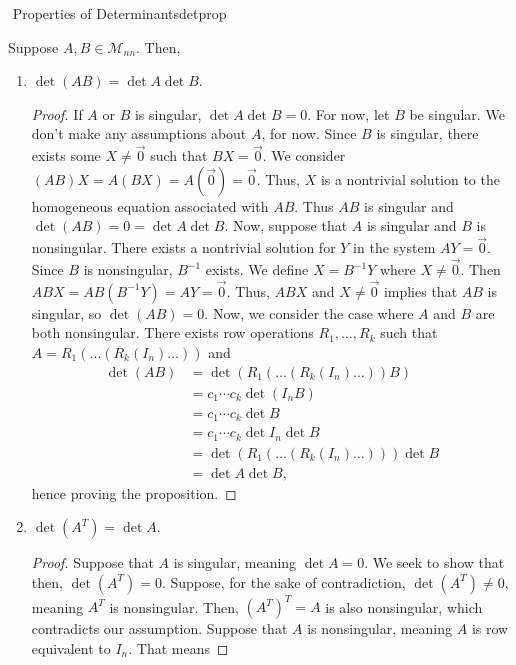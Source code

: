         \begin{theorem}{\Stop\,\,Properties of Determinants}{detprop}

            Suppose \(A,B\in\mathcal{M}_{nn}\). Then,
            \begin{enumerate}
                \item \(\det (AB) = \det A\det B\).
                \begin{proof}
                    If \(A\) or \(B\) is singular, \(\det A\det B=0\). For now, let \(B\) be singular. We don't make any assumptions about \(A\), for now. Since \(B\) is singular, there exists some \(X\neq\vec{0}\) such that \(BX=\vec{0}\). We consider \((AB)X=A(BX)=A(\vec{0})=\vec{0}\). Thus, \(X\) is a nontrivial solution to the homogeneous equation associated with \(AB\). Thus \(AB\) is singular and \(\det (AB) = 0 = \det A\det B\). Now, suppose that \(A\) is singular and \(B\) is nonsingular. There exists a nontrivial solution for \(Y\) in the system \(AY=\vec{0}\). Since \(B\) is nonsingular, \(B^{-1}\) exists. We define \(X=B^{-1}Y\) where \(X\neq\vec{0}\). Then \(ABX=AB(B^{-1}Y)=AY=\vec{0}\). Thus, \(ABX\) and \(X\neq \vec{0}\) implies that \(AB\) is singular, so \(\det (AB)=0\). Now, we consider the case where \(A\) and \(B\) are both nonsingular. There exists row operations \(R_1,\ldots,R_k\) such that \(A=R_1(\ldots(R_k(I_n)\ldots))\) and 
                    \begin{align*}
                        \det (AB)&=\det(R_1(\ldots(R_k(I_n)\ldots))B) \\
                        &=c_1\cdots c_k\det (I_nB) \\
                        &=c_1\cdots c_k\det B \\
                        &=c_1\cdots c_k \det I_n\det B \\
                        &=\det(R_1(\ldots(R_k(I_n)\ldots)))\det B \\
                        &=\det A\det B,
                    \end{align*}
                    hence proving the proposition.
                \end{proof}
                \item \(\det (A^T) = \det A\).
                \begin{proof}
                    Suppose that \(A\) is singular, meaning \(\det A=0\). We seek to show that then, \(\det (A^T)=0\). Suppose, for the sake of contradiction, \(\det (A^T)\neq0\), meaning \(A^T\) is nonsingular. Then, \((A^T)^T=A\) is also nonsingular, which contradicts our assumption. Suppose that \(A\) is nonsingular, meaning \(A\) is row equivalent to \(I_n\). That means

\end{proof}
\end{enumerate}
\end{theorem}
